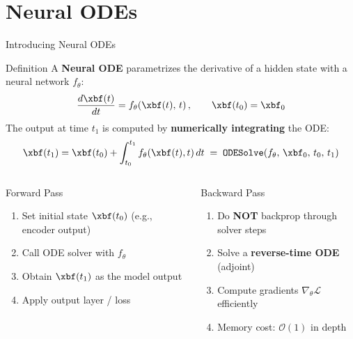 \documentclass[aspectratio=169,xcolor=dvipsnames,svgnames,x11names,fleqn]{beamer}
\begin{document}
\section{Neural ODEs}
 
\begin{frame}{Introducing Neural ODEs}
\scriptsize
\begin{tblockFrost}{Definition}
A \textbf{Neural ODE} parametrizes the derivative of a hidden state with a neural network $f_\theta$:
$$
  \frac{d\xbf(t)}{dt} = f_\theta\!\left(\xbf(t),\, t\right), \qquad \xbf(t_0) = \xbf_0
$$
The output at time $t_1$ is computed by \textbf{numerically integrating} the ODE:
$$
  \xbf(t_1) = \xbf(t_0) + \int_{t_0}^{t_1} f_\theta\!\left(\xbf(t), t\right) dt
  \;=\; \texttt{ODESolve}(f_\theta,\, \xbf_0,\, t_0,\, t_1)
$$
\end{tblockFrost}
\vspace{4pt}
\begin{columns}
\begin{block}{Forward Pass}
\begin{enumerate}
  \item Set initial state $\xbf(t_0)$ (e.g., encoder output)
  \item Call ODE solver with $f_\theta$
  \item Obtain $\xbf(t_1)$ as the model output
  \item Apply output layer / loss
\end{enumerate}
\end{block}
\begin{block}{Backward Pass}
\begin{enumerate}
  \item Do \textbf{NOT} backprop through solver steps
  \item Solve a \textbf{reverse-time ODE} (adjoint)
  \item Compute gradients $\nabla_\theta \mathcal{L}$ efficiently
  \item Memory cost: $\mathcal{O}(1)$ in depth
\end{enumerate}
\end{block}
\end{columns}
\end{frame}
\end{document}
